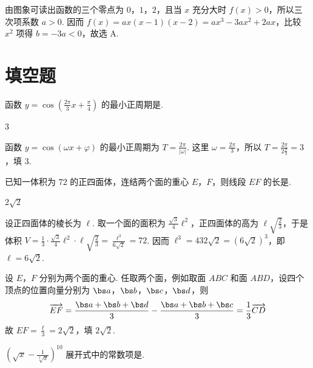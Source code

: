 \begin{solution}
由图象可读出函数的三个零点为 \(0\)，\(1\)，\(2\)，且当 \(x\) 充分大时 \(f(x)>0\)，所以三次项系数 \(a>0\). 因而 \(f(x)=ax(x-1)(x-2)=ax^3-3ax^2+2ax\)，比较 \(x^2\) 项得 \(b=-3a<0\)，故选 A.
\end{solution}

\section{填空题}

\begin{problem}
函数 \(y=\cos\left(\frac{2\pi}{3}x+\frac{\pi}{4}\right)\) 的最小正周期是\fillinblank{}.
\end{problem}

\begin{answer}
\(3\)
\end{answer}

\begin{solution}
函数 \(y=\cos(\omega x+\varphi)\) 的最小正周期为 \(T=\frac{2\pi}{|\omega|}\). 这里 \(\omega=\frac{2\pi}{3}\)，所以 \(T=\frac{2\pi}{2\frac{\pi}{3}}=3\)，填 \(3\).
\end{solution}

\begin{problem}
已知一体积为 \(72\) 的正四面体，连结两个面的重心 \(E\)，\(F\)，则线段 \(EF\) 的长是\fillinblank{}.
\end{problem}

\begin{answer}
\(2\sqrt{2}\)
\end{answer}

\begin{solution}
设正四面体的棱长为 \(\ell\). 取一个面的面积为 \(\frac{\sqrt3}{4}\ell^2\)，正四面体的高为 \(\ell\sqrt{\frac23}\)，于是体积
\(V=\frac13\cdot\frac{\sqrt3}{4}\ell^2\cdot\ell\sqrt{\frac23}=\frac{\ell^3}{6\sqrt2}=72\). 因而 \(\ell^3=432\sqrt2=(6\sqrt2)^3\)，即 \(\ell=6\sqrt2\).

设 \(E\)，\(F\) 分别为两个面的重心. 任取两个面，例如取面 \(ABC\) 和面 \(ABD\)，设四个顶点的位置向量分别为 \(\bs a\)，\(\bs b\)，\(\bs c\)，\(\bs d\)，则
\[
\overrightarrow{EF}=\frac{\bs a+\bs b+\bs d}{3}-\frac{\bs a+\bs b+\bs c}{3}=\frac13\overrightarrow{CD}
\]
故 \(EF=\frac\ell3=2\sqrt2\)，填 \(2\sqrt2\).
\end{solution}

\begin{problem}
\(\left(\sqrt{x}-\frac{1}{\sqrt[3]{x}}\right)^{10}\) 展开式中的常数项是\fillinblank{}.
\end{problem}

